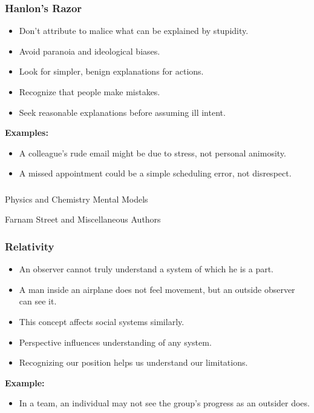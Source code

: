 \begin{frame}[fragile]\frametitle{Hanlon’s Razor}
\begin{itemize}
    \item Don’t attribute to malice what can be explained by stupidity.
    \item Avoid paranoia and ideological biases.
    \item Look for simpler, benign explanations for actions.
    \item Recognize that people make mistakes.
    \item Seek reasonable explanations before assuming ill intent.
\end{itemize}
\textbf{Examples:}
\begin{itemize}
    \item A colleague's rude email might be due to stress, not personal animosity.
    \item A missed appointment could be a simple scheduling error, not disrespect.
\end{itemize}
\end{frame}


\begin{frame}[fragile]\frametitle{}
\begin{center}
{\Large Physics and Chemistry Mental Models}

{\tiny Farnam Street and Miscellaneous Authors }


\end{center}
\end{frame}

\begin{frame}[fragile]\frametitle{Relativity}
\begin{itemize}
    \item An observer cannot truly understand a system of which he is a part.
    \item A man inside an airplane does not feel movement, but an outside observer can see it.
    \item This concept affects social systems similarly.
    \item Perspective influences understanding of any system.
    \item Recognizing our position helps us understand our limitations.
\end{itemize}
\textbf{Example:}
\begin{itemize}
    \item In a team, an individual may not see the group's progress as an outsider does.
\end{itemize}
\end{frame}

